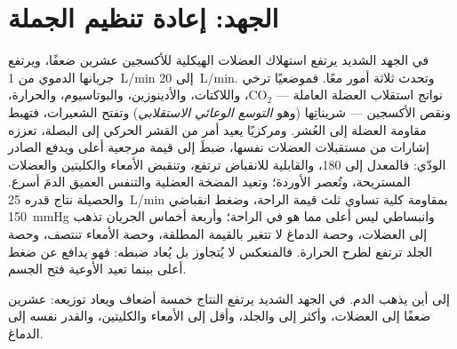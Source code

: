 \section{الجهد: إعادة تنظيم الجملة}

\begin{proposition}[الجهد]\label{prop:b2:blood-pressure:exercise}
في الجهد الشديد يرتفع استهلاك العضلات الهيكلية للأكسجين
عشرين ضعفًا، ويرتفع جريانها الدموي من \qty{1}{L/min} إلى \qty{20}{L/min}.
وتحدث ثلاثة أمور معًا. فموضعيًا ترخي نواتج استقلاب العضلة
العاملة --- $\mathrm{CO_2}$، واللاكتات، والأدينوزين، والبوتاسيوم، والحرارة،
ونقص الأكسجين --- شريناتِها (وهو \emph{التوسع الوعائي الاستقلابي})
وتفتح الشعيرات، فتهبط مقاومة العضلة إلى
العُشر. ومركزيًا يعيد أمر من القشر الحركي إلى البصلة،
تعززه إشارات من مستقبلات العضلات نفسها، ضبطَ
 إلى قيمة مرجعية أعلى ويدفع الصادر الودّي:
فالمعدل إلى 180، والقابلية للانقباض ترتفع، وتنقبض 
الأمعاء والكليتين والعضلات المستريحة، وتُعصر الأوردة؛ وتعيد المضخة
العضلية والتنفس العميق الدمَ أسرع. والحصيلة نتاج قدره
\qty{25}{L/min} بمقاومة كلية تساوي ثلث قيمة الراحة،
وضغط انقباضي \qty{150}{mmHg} وانبساطي ليس أعلى
مما هو في الراحة؛ وأربعة أخماس الجريان تذهب إلى العضلات، وحصة الدماغ
لا تتغير بالقيمة المطلقة، وحصة الأمعاء تنتصف،
وحصة الجلد ترتفع لطرح الحرارة. فالمنعكس لا يُتجاوز بل
يُعاد ضبطه: فهو يدافع عن ضغط أعلى بينما تعيد الأوعية فتح
الجسم.
\end{proposition}

\begin{omfigure}

{\small إلى أين يذهب الدم. في الجهد الشديد يرتفع النتاج
خمسة أضعاف ويعاد توزيعه: عشرين ضعفًا إلى العضلات، وأكثر إلى
 والجلد، وأقل إلى الأمعاء والكليتين، والقدر نفسه إلى
الدماغ.}
\end{omfigure}

